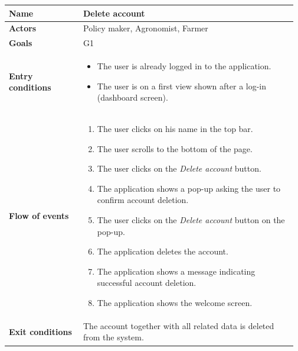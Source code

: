 \begin{table}[H]
    \centering
	\begin{tabular}{@{}p{0.25\linewidth} p{0.72\linewidth}@{}}
\toprule
		\textbf{Name}               & Delete account\\
		\midrule
		\textbf{Actors}             & Policy maker, Agronomist, Farmer\\
		\midrule
		\textbf{Goals}              & G1 \\
		\midrule
		
		\textbf{Entry conditions}   & \begin{itemize}[leftmargin=.4cm,noitemsep,topsep=0pt,before=\vspace{-3mm},after=\vspace{-4mm}]
		    \item The user is already logged in to the application.
		    \item The user is on a first view shown after a log-in (dashboard screen).
		\end{itemize}\\
		\midrule
		
		\textbf{Flow of events}     & \begin{enumerate}[leftmargin=.4cm,noitemsep,topsep=0pt,before=\vspace{-3mm},after=\vspace{-4mm}]
		    \item The user clicks on his name in the top bar.
		    \item The user scrolls to the bottom of the page.
		    \item The user clicks on the \textit{Delete account} button.
		    \item The application shows a pop-up asking the user to confirm account deletion.
		    \item The user clicks on the \textit{Delete account} button on the pop-up.
		    \item The application deletes the account.
		    \item The application shows a message indicating successful account deletion.
		    \item The application shows the welcome screen.
		\end{enumerate}\\
		\midrule
		\textbf{Exit conditions}    & The account together with all related data is deleted from the system. \\
		\midrule
		

\end{tabular}
\end{table}
